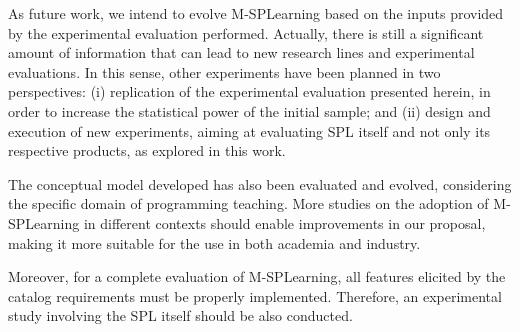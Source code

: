 As future work, we intend to evolve M-SPLear\allowbreak ning based on the inputs provided by the experimental evaluation performed. Actually, there is still a significant amount of information that can lead to new research lines and experimental evaluations. 
In this sense, other experiments have been planned in two perspectives: (i) replication of the experimental evaluation presented herein, in order to increase the statistical power of the initial sample; and (ii) design and execution of new experiments, aiming at evaluating SPL itself and not only its respective products, as explored in this work.


The conceptual model developed has also been evaluated and evolved, considering the specific domain of programming teaching. More studies on the adoption of M-SPLear\allowbreak ning in different contexts should enable improvements in our proposal, making it more suitable for the use in both academia and industry.

Moreover, for a complete evaluation of M-SPLear\allowbreak ning, all features elicited by the catalog requirements must be properly implemented. Therefore, an experimental study involving the SPL itself should be also conducted. %

